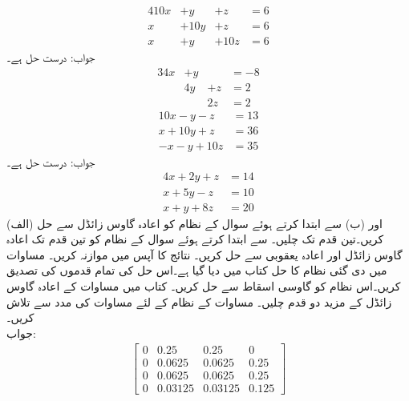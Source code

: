 \quad
\begin{alignat*}{4}
10x&+y&+z&=6\\
x&+10y&+z&=6\\
x&+y&+10z&=6
\end{alignat*}
جواب:\quad
درست حل  ہے۔
\begin{alignat*}{3}
4x&+y&{}&=-8\\
{}&4y&+z&=2\\
&{}&{}2z&=2
\end{alignat*}
\quad
\begin{align*}
10x-y-z&=13\\
x+10y+z&=36\\
-x-y+10z&=35
\end{align*}
جواب:\quad
درست حل  ہے۔
\quad
\begin{align*}
4x+2y+z&=14\\
x+5y-z&=10\\
x+y+8z&=20
\end{align*}
\quad
(الف)  اور (ب)   سے ابتدا کرتے ہوئے سوال  کے نظام کو اعادہ گاوس زائڈل سے حل کریں۔تین قدم تک چلیں۔ 
\quad
{} سے ابتدا کرتے ہوئے سوال  کے نظام  کو تین قدم تک اعادہ گاوس زائڈل اور اعادہ یعقوبی سے حل کریں۔ نتائج کا آپس میں موازنہ کریں۔
\quad
مساوات  میں دی گئی نظام کا حل کتاب میں دیا گیا ہے۔اس حل کی تمام قدموں  کی تصدیق کریں۔اس نظام کو گاوسی اسقاط سے حل کریں۔
\quad
کتاب میں مساوات  کے اعادہ  گاوس زائڈل   کے مزید دو قدم چلیں۔ 
\quad
مساوات   کے نظام کے لئے مساوات   کی مدد سے  تلاش کریں۔\\
جواب:
\begin{align*}
\begin{bmatrix}
0&0.25&0.25&0\\
0&0.0625&0.0625&0.25\\
0&0.0625&0.0625&0.25\\
0&0.03125&0.03125&0.125
\end{bmatrix}
\end{align*}
